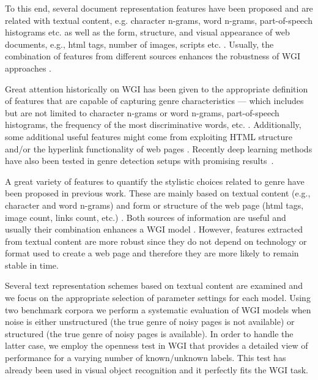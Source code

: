  To this end, several document representation features have been proposed and are related with textual content, e.g. character n-grams, word n-grams, part-of-speech histograms etc. \parencite{kumari2014web,petrenz2011stable,mason2009n,sharoff2010web} as well as the form, structure, and visual appearance of web documents, e.g., html tags, number of images, scripts etc. \parencite{Lim2005,levering2008using}. Usually, the combination of features from different sources enhances the robustness of WGI approaches \parencite{levering2008using,kanaris2009learning}.

Great attention historically on WGI has been given to the appropriate definition of features that are capable of capturing genre characteristics --- which includes but are not limited to character n-grams or word n-grams, part-of-speech histograms, the frequency of the most discriminative words, etc.  \cite{kanaris2009learning,kumari2014web,levering2008using,Lim2005,mason2009n,onan2018ensemble,petrenz2011stable,sharoff2010web}. Additionally, some additional useful features might come from exploiting HTML structure and/or the hyperlink functionality of web pages \cite{abramson2012_URL,asheghi2014semi,jebari2014pure_URL,priyatam2013don_URL,zhu2011enhance}. Recently deep learning methods have also been tested in genre detection setups with promising results~\cite{worsham2018genre}. 

A great variety of features to quantify the stylistic choices related to genre have been proposed in previous work. These are mainly based on textual content (e.g., character and word  n-grams) \parencite{mason2009distance,Sharroff2010} and form or structure of the web page (html tags, image count, links count, etc.) \parencite{Lim2005,levering2008using}. Both sources of  information are useful and usually their combination enhances a WGI model \parencite{kanaris2009learning}. However, features extracted from textual content are more robust since they do not  depend on technology or format used to create a web page and therefore they are more likely to remain stable in time.

 Several text  representation schemes based on textual content are examined and we focus on the appropriate selection of parameter settings for each model. Using two benchmark corpora we perform a  systematic evaluation of WGI models when noise is either unstructured (the true genre of noisy pages is not available) or structured (the true genre of noisy pages is available). In order  to handle the latter case, we employ the openness test in WGI that provides a detailed view of performance for a varying number of known/unknown labels. This test has already been used in  visual object recognition \parencite{scheirer2013toward} and it perfectly fits the WGI task.

